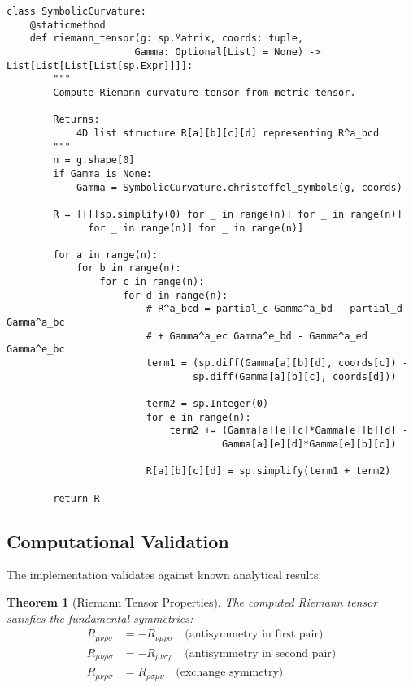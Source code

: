 \documentclass[11pt,a4paper]{article}
\newtheorem{theorem}{Theorem}[section]
\theoremstyle{definition}
\theoremstyle{remark}
\begin{document}
\begin{lstlisting}
class SymbolicCurvature:
    @staticmethod
    def riemann_tensor(g: sp.Matrix, coords: tuple, 
                      Gamma: Optional[List] = None) -> List[List[List[List[sp.Expr]]]]:
        """
        Compute Riemann curvature tensor from metric tensor.
        
        Returns:
            4D list structure R[a][b][c][d] representing R^a_bcd
        """
        n = g.shape[0]
        if Gamma is None:
            Gamma = SymbolicCurvature.christoffel_symbols(g, coords)
        
        R = [[[[sp.simplify(0) for _ in range(n)] for _ in range(n)] 
              for _ in range(n)] for _ in range(n)]
        
        for a in range(n):
            for b in range(n):
                for c in range(n):
                    for d in range(n):
                        # R^a_bcd = partial_c Gamma^a_bd - partial_d Gamma^a_bc
                        # + Gamma^a_ec Gamma^e_bd - Gamma^a_ed Gamma^e_bc
                        term1 = (sp.diff(Gamma[a][b][d], coords[c]) - 
                                sp.diff(Gamma[a][b][c], coords[d]))
                        
                        term2 = sp.Integer(0)
                        for e in range(n):
                            term2 += (Gamma[a][e][c]*Gamma[e][b][d] - 
                                     Gamma[a][e][d]*Gamma[e][b][c])
                        
                        R[a][b][c][d] = sp.simplify(term1 + term2)
        
        return R
\end{lstlisting}

\subsection{Computational Validation}

The implementation validates against known analytical results:

\begin{theorem}[Riemann Tensor Properties]
The computed Riemann tensor satisfies the fundamental symmetries:
\begin{align}
R_{\mu\nu\rho\sigma} &= -R_{\nu\mu\rho\sigma} \quad \text{(antisymmetry in first pair)} \\
R_{\mu\nu\rho\sigma} &= -R_{\mu\nu\sigma\rho} \quad \text{(antisymmetry in second pair)} \\
R_{\mu\nu\rho\sigma} &= R_{\rho\sigma\mu\nu} \quad \text{(exchange symmetry)}
\end{align}
\end{theorem}
\end{document}
